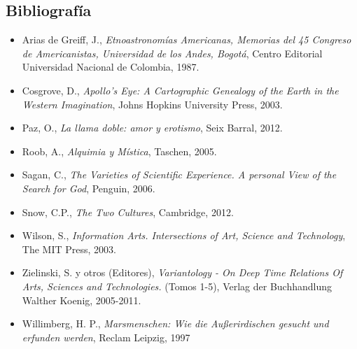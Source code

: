 \documentclass[12pt]{report}
\begin{document}
\subsection*{Bibliograf\'ia}

\begin{itemize}

\item Arias de Greiff, J., \emph{Etnoastronom\'ias Americanas, Memorias
del 45 Congreso de Americanistas, Universidad de los Andes, Bogot\'a},
  Centro Editorial Universidad Nacional de Colombia, 1987.

\item Cosgrove, D., \emph{Apollo's Eye: A Cartographic Genealogy of
  the Earth in the Western Imagination}, Johns Hopkins University
  Press, 2003.
\item Paz, O., \emph{La llama doble: amor y erotismo}, Seix Barral, 2012.
\item Roob, A., \emph{Alquimia y M\'istica}, Taschen, 2005.
\item Sagan, C., \emph{The Varieties of Scientific Experience. A personal View of the Search for God}, Penguin, 2006.
\item Snow, C.P., \emph{The Two Cultures}, Cambridge, 2012.
\item Wilson, S., \emph{Information Arts. Intersections of Art, Science
and Technology}, The MIT Press, 2003.
\item Zielinski, S. y otros (Editores), \emph{Variantology - On Deep Time
  Relations Of Arts, Sciences and Technologies.} (Tomos 1-5), Verlag
der Buchhandlung Walther Koenig, 2005-2011.

\item Willimberg, H. P., \emph{Marsmenschen:  Wie die Au\ss erirdischen
  gesucht und erfunden werden}, Reclam Leipzig, 1997

\end{itemize}
\end{document}
